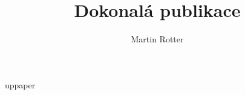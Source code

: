 \documentclass[12pt]{article}
\title{Dokonalá publikace}
\author{Martin Rotter}
\begin{document}
\maketitle

uppaper
\end{document}
